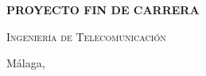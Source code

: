 \begin{spacing}{1}
\begin{titlepage}
	\bigskip
	
	\begin{center}\Large\textbf{\textsf{PROYECTO FIN DE CARRERA}}\end{center}
	
	\medskip
	
	\begin{center}
		\Huge
		\sffamily\scshape
		\pfctitlename
	\end{center}
	
	\medskip
	
	\begin{center}
		\Huge
		\scshape%
		\textsf{Ingeniería de Telecomunicación}
	\end{center}
	
	\vfill
	
	{\large Málaga, \pfcanno \hfill \pfcauthorname}
	\blankpage
\end{titlepage}
\end{spacing}